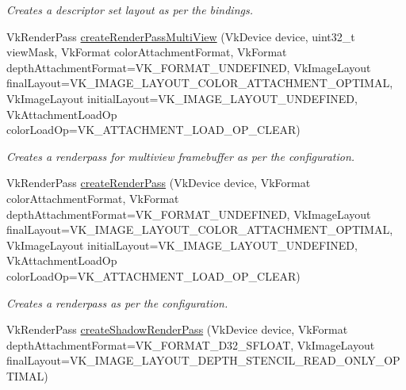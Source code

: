 \begin{DoxyCompactItemize}
\begin{DoxyCompactList}\small\item\em Creates a descriptor set layout as per the bindings. \end{DoxyCompactList}\item 
Vk\+Render\+Pass \hyperlink{namespaceblaze_1_1util_a8bfb96e0326c09767cafb5e66c6ac25b}{create\+Render\+Pass\+Multi\+View} (Vk\+Device device, uint32\+\_\+t view\+Mask, Vk\+Format color\+Attachment\+Format, Vk\+Format depth\+Attachment\+Format=V\+K\+\_\+\+F\+O\+R\+M\+A\+T\+\_\+\+U\+N\+D\+E\+F\+I\+N\+ED, Vk\+Image\+Layout final\+Layout=V\+K\+\_\+\+I\+M\+A\+G\+E\+\_\+\+L\+A\+Y\+O\+U\+T\+\_\+\+C\+O\+L\+O\+R\+\_\+\+A\+T\+T\+A\+C\+H\+M\+E\+N\+T\+\_\+\+O\+P\+T\+I\+M\+AL, Vk\+Image\+Layout initial\+Layout=V\+K\+\_\+\+I\+M\+A\+G\+E\+\_\+\+L\+A\+Y\+O\+U\+T\+\_\+\+U\+N\+D\+E\+F\+I\+N\+ED, Vk\+Attachment\+Load\+Op color\+Load\+Op=V\+K\+\_\+\+A\+T\+T\+A\+C\+H\+M\+E\+N\+T\+\_\+\+L\+O\+A\+D\+\_\+\+O\+P\+\_\+\+C\+L\+E\+AR)
\begin{DoxyCompactList}\small\item\em Creates a renderpass for multiview framebuffer as per the configuration. \end{DoxyCompactList}\item 
Vk\+Render\+Pass \hyperlink{namespaceblaze_1_1util_afae587cb481573dc62dbf7d67de1aff9}{create\+Render\+Pass} (Vk\+Device device, Vk\+Format color\+Attachment\+Format, Vk\+Format depth\+Attachment\+Format=V\+K\+\_\+\+F\+O\+R\+M\+A\+T\+\_\+\+U\+N\+D\+E\+F\+I\+N\+ED, Vk\+Image\+Layout final\+Layout=V\+K\+\_\+\+I\+M\+A\+G\+E\+\_\+\+L\+A\+Y\+O\+U\+T\+\_\+\+C\+O\+L\+O\+R\+\_\+\+A\+T\+T\+A\+C\+H\+M\+E\+N\+T\+\_\+\+O\+P\+T\+I\+M\+AL, Vk\+Image\+Layout initial\+Layout=V\+K\+\_\+\+I\+M\+A\+G\+E\+\_\+\+L\+A\+Y\+O\+U\+T\+\_\+\+U\+N\+D\+E\+F\+I\+N\+ED, Vk\+Attachment\+Load\+Op color\+Load\+Op=V\+K\+\_\+\+A\+T\+T\+A\+C\+H\+M\+E\+N\+T\+\_\+\+L\+O\+A\+D\+\_\+\+O\+P\+\_\+\+C\+L\+E\+AR)
\begin{DoxyCompactList}\small\item\em Creates a renderpass as per the configuration. \end{DoxyCompactList}\item 
Vk\+Render\+Pass \hyperlink{namespaceblaze_1_1util_ab60653fd3d81b99d9bbd45be383aff43}{create\+Shadow\+Render\+Pass} (Vk\+Device device, Vk\+Format depth\+Attachment\+Format=V\+K\+\_\+\+F\+O\+R\+M\+A\+T\+\_\+\+D32\+\_\+\+S\+F\+L\+O\+AT, Vk\+Image\+Layout final\+Layout=V\+K\+\_\+\+I\+M\+A\+G\+E\+\_\+\+L\+A\+Y\+O\+U\+T\+\_\+\+D\+E\+P\+T\+H\+\_\+\+S\+T\+E\+N\+C\+I\+L\+\_\+\+R\+E\+A\+D\+\_\+\+O\+N\+L\+Y\+\_\+\+O\+P\+T\+I\+M\+AL)

\end{DoxyCompactItemize}
